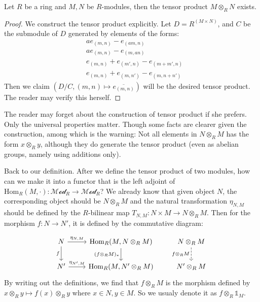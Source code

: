 \documentclass{note-eng}
\begin{document}
\begin{proposition}
    Let $R$ be a ring and $M, N$ be $R$-modules, then the tensor product $M \otimes_R N$ exists.
\end{proposition}

\begin{proof}
    We construct the tensor product explicitly. Let $D = R^{(M \times N)}$, and $C$ be the submodule of $D$ generated by elements of the forms:
    $$
        \begin{aligned}
        &ae_{(m, n)} - e_{(am, n)} \\
        &ae_{(m, n)} - e_{(m, an)} \\
        &e_{(m, n)} + e_{(m', n)} - e_{(m + m', n)} \\
        &e_{(m, n)} + e_{(m, n')} - e_{(m, n + n')}
        \end{aligned}
    $$
    Then we claim $(D / C, (m, n) \mapsto \overline{e_{(m, n)}})$ will be the desired tensor product. The reader may verify this herself.
\end{proof}

The reader may forget about the construction of tensor product if she prefers. Only the universal properties matter. Though some facts are clearer given the construction, among which is the warning: Not all elements in $N \otimes_R M$ has the form $x \otimes_R y$, although they do generate the tensor product (even as abelian groups, namely using additions only).

Back to our definition. After we define the tensor product of two modules, how can we make it into a functor that is the left adjoint of $\mathrm{Hom}_{R}(M, \cdot): \mathscr{Mod}_R \rightarrow \mathscr{Mod}_R$? We already know that given object $N$, the corresponding object should be $N \otimes_R M$ and the natural transformation $\eta_{N, M}$ should be defined by the $R$-bilinear map $T_{N, M}: N \times M \rightarrow N \otimes_R M$. Then for the morphism $f: N \rightarrow N'$, it is defined by the commutative diagram:

\[\begin{tikzcd}
	N & {\mathrm{Hom}_R(M, N \otimes_R M)} & {N \otimes_R M} \\
	{N'} & {\mathrm{Hom}_R(M, N' \otimes_R M)} & {N' \otimes_R M}
	\arrow["{\eta_{N, M}}", from=1-1, to=1-2]
	\arrow["f"', from=1-1, to=2-1]
	\arrow["{(f \otimes_RM)_\ast}"', from=1-2, to=2-2]
	\arrow["{f \otimes_R M}"', dashed, from=1-3, to=2-3]
	\arrow["{\eta_{N', M}}", from=2-1, to=2-2]
\end{tikzcd}\]
By writing out the definitions, we find that $f \otimes_R M$ is the morphism defined by $x \otimes_R y \mapsto f(x) \otimes_R y$ where $x \in N, y \in M$. So we usualy denote it as $f \otimes_R \mathds{1}_M$.
\end{document}
